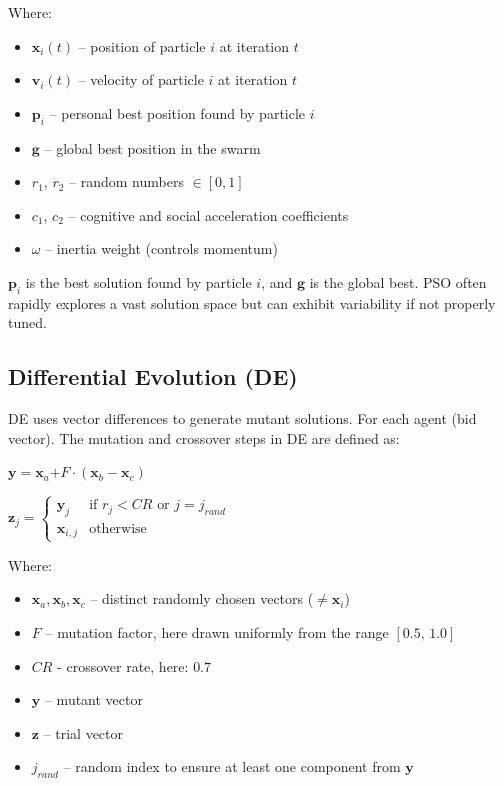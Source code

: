 \documentclass[sigconf]{acmart}
\begin{document}
	
	Where:
	\begin{itemize}
		\item $\mathbf{x}_i(t)$ – position of particle $i$ at iteration $t$
		\item $\mathbf{v}_i(t)$ – velocity of particle $i$ at iteration $t$
		\item $\mathbf{p}_i$ – personal best position found by particle $i$
		\item $\mathbf{g}$ – global best position in the swarm
		\item $r_1$, $r_2$ – random numbers $\in [0,1]$
		\item $c_1$, $c_2$ – cognitive and social acceleration coefficients
		\item $\omega$ – inertia weight (controls momentum)
	\end{itemize}
	

	$\mathbf{p}_i$ is the best solution found by particle $i$, and $\mathbf{g}$ is the global best. PSO often rapidly explores a vast solution space but can exhibit variability if not properly tuned.
	
	\subsection{Differential Evolution (DE)}
	DE uses vector differences to generate mutant solutions. For each agent (bid vector). The mutation and crossover steps in DE are defined as:
	
	$
	\mathbf{y} = \mathbf{x}_a \mathbf{+} F \cdot (\mathbf{x}_b - \mathbf{x}_c)
	$
	
	
	$\mathbf{z}_j =
	\begin{cases}
		\mathbf{y}_j & \text{if } r_j < CR \text{ or } j = j_{rand} \\
		\mathbf{x}_{i,j} & \text{otherwise}
	\end{cases}
	$
	
	Where:
	\begin{itemize}
		\item $\mathbf{x}_a, \mathbf{x}_b, \mathbf{x}_c$ – distinct randomly chosen vectors ($\ne \mathbf{x}_i$)
		\item $F$ – mutation factor, here drawn uniformly from the range $[0.5,\,1.0]$
		\item $CR$ - crossover rate, here: $0.7$
		\item $\mathbf{y}$ – mutant vector
		\item $\mathbf{z}$ – trial vector
		\item $j_{rand}$ – random index to ensure at least one component from $\mathbf{y}$
	\end{itemize}
	
\end{document}
